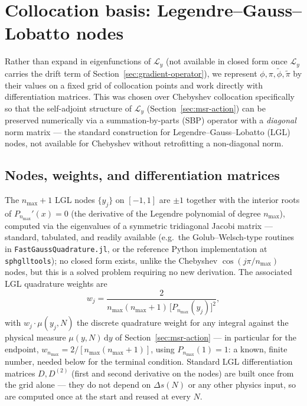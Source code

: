 \documentclass[a4paper,11pt]{article}
\renewcommand{\d}{\mathrm{d}}
\newcommand{\Ny}{N}                          %
\newcommand{\field}{\phi}                    %
\newcommand{\mom}{\pi}                       %
\newcommand{\rfield}{\widetilde\field}       %
\newcommand{\rmom}{\widetilde\mom}           %
\newcommand{\yco}{y}                         %
\newcommand{\Deltas}{\Delta s}                %
\newcommand{\measure}{\mu}                   %
\newcommand{\Lop}{\mathcal{L}_\yco}          %
\newcommand{\modeidx}{n}                     %
\begin{document}
\section{Collocation basis: Legendre--Gauss--Lobatto nodes}
\label{sec:collocation-basis}

Rather than expand in eigenfunctions of $\Lop$ (not available in closed
form once $\Lop$ carries the drift term of Section~\ref{sec:gradient-operator}),
we
represent $\field,\mom,\rfield,\rmom$ by their values on a fixed grid of
collocation points and work directly with differentiation matrices. This
was chosen over Chebyshev collocation specifically so that the
self-adjoint structure of $\Lop$ (Section~\ref{sec:msr-action}) can be
preserved numerically via a summation-by-parts (SBP) operator with a
\emph{diagonal} norm matrix --- the standard construction for
Legendre--Gauss--Lobatto (LGL) nodes, not available for Chebyshev without
retrofitting a non-diagonal norm.

\subsection{Nodes, weights, and differentiation matrices}

The $\modeidx_{\max}+1$ LGL nodes $\{\yco_j\}$ on $[-1,1]$ are $\pm1$
together with the interior roots of $P_{\modeidx_{\max}}'(x)=0$ (the
derivative of the Legendre polynomial of degree $\modeidx_{\max}$),
computed via the eigenvalues of a symmetric tridiagonal Jacobi matrix ---
standard, tabulated, and readily available (e.g.\ the Golub--Welsch-type
routines in \texttt{FastGaussQuadrature.jl}, or the reference Python
implementation at \texttt{sphglltools}); no closed form exists, unlike the
Chebyshev $\cos(j\pi/\modeidx_{\max})$ nodes, but this is a solved problem
requiring no new derivation. The associated LGL quadrature weights are
\begin{equation}
    w_j = \frac{2}{\modeidx_{\max}(\modeidx_{\max}+1)\,\big[P_{\modeidx_{\max}}(\yco_j)\big]^2} ,
    \label{eq:lgl-weights}
\end{equation}
with $w_j\cdot\measure(\yco_j,\Ny)$ the discrete quadrature weight for any
integral against the physical measure $\measure(\yco,\Ny)\,\d\yco$ of
Section~\ref{sec:msr-action} --- in particular for the endpoint,
$w_{\modeidx_{\max}} = 2/[\modeidx_{\max}(\modeidx_{\max}+1)]$, using
$P_{\modeidx_{\max}}(1)=1$: a known, finite number, needed below for the
terminal condition. Standard LGL differentiation matrices $D,D^{(2)}$
(first and second derivative on the nodes) are built once from the grid
alone --- they do not depend on $\Deltas(\Ny)$ or any other physics input,
so are computed once at the start and reused at every $\Ny$.
\end{document}
